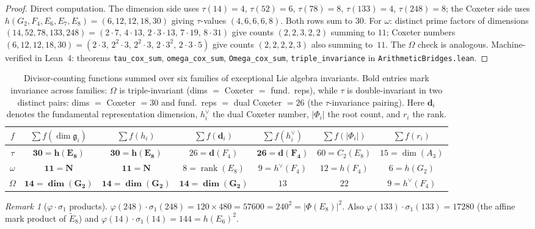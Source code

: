 \documentclass[11pt]{amsart}
\theoremstyle{plain}
\theoremstyle{definition}
\theoremstyle{remark}
\newtheorem{remark}[theorem]{Remark}
\newcommand{\fg}{\mathfrak{g}}
\renewcommand{\Phi}{\varPhi}
\newcommand{\rank}{\operatorname{rank}}
\begin{document}
\begin{proof}
Direct computation. The dimension side uses $\tau(14)=4$, $\tau(52)=6$,
$\tau(78)=8$, $\tau(133)=4$, $\tau(248)=8$; the Coxeter side uses
$h(G_2,F_4,E_6,E_7,E_8)=(6,12,12,18,30)$ giving $\tau$-values
$(4,6,6,6,8)$.  Both rows sum to $30$.  For $\omega$: distinct prime
factors of dimensions $(14,52,78,133,248)=(2{\cdot}7,\,4{\cdot}13,\,2{\cdot}3{\cdot}13,\,
7{\cdot}19,\,8{\cdot}31)$ give counts $(2,2,3,2,2)$ summing to $11$; Coxeter
numbers $(6,12,12,18,30)=(2{\cdot}3,\,2^2{\cdot}3,\,2^2{\cdot}3,\,2{\cdot}3^2,\,
2{\cdot}3{\cdot}5)$ give counts $(2,2,2,2,3)$ also summing to~$11$.  The
$\Omega$ check is analogous.  Machine-verified in Lean~4: theorems
\texttt{tau\_cox\_sum}, \texttt{omega\_cox\_sum}, \texttt{Omega\_cox\_sum},
\texttt{triple\_invariance} in \texttt{ArithmeticBridges.lean}.
\end{proof}

\begin{table}[ht]
\centering
\begin{tabular}{ccccccc}
\toprule
$f$ & $\sum f(\dim\fg_i)$ & $\sum f(h_i)$ & $\sum f(\mathbf{d}_i)$ & $\sum f(h^\vee_i)$ & $\sum f(|\Phi_i|)$ & $\sum f(r_i)$ \\
\midrule
$\tau$ & $\mathbf{30 = h(E_8)}$ & $\mathbf{30 = h(E_8)}$ & $26 = \mathbf{d}(F_4)$ & $\mathbf{26 = \mathbf{d}(F_4)}$ & $60 = C_2(E_8)$ & $15 = \dim(A_3)$ \\
$\omega$ & $\mathbf{11 = N}$ & $\mathbf{11 = N}$ & $8 = \rank(E_8)$ & $9 = h^\vee(F_4)$ & $12 = h(F_4)$ & $6 = h(G_2)$ \\
$\Omega$ & $\mathbf{14 = \dim(G_2)}$ & $\mathbf{14 = \dim(G_2)}$ & $\mathbf{14 = \dim(G_2)}$ & $13$ & $22$ & $9 = h^\vee(F_4)$ \\
\bottomrule
\end{tabular}
\caption{Divisor-counting functions summed over six families of exceptional
  Lie algebra invariants.  Bold entries mark invariance across families:
  $\Omega$ is triple-invariant (dims $=$ Coxeter $=$ fund.\ reps), while
  $\tau$ is double-invariant in two distinct pairs: dims $=$ Coxeter $= 30$
  and fund.\ reps $=$ dual Coxeter $= 26$ (the $\tau$-invariance pairing).
  Here $\mathbf{d}_i$ denotes the fundamental representation dimension,
  $h^\vee_i$ the dual Coxeter number, $|\Phi_i|$ the root count, and $r_i$
  the rank.}\label{tab:sum-over-families}
\end{table}

\begin{remark}[$\varphi \cdot \sigma_1$ products]\label{rem:phi-sigma-product}
$\varphi(248) \cdot \sigma_1(248) = 120 \times 480 = 57600 = 240^2 = |\Phi(E_8)|^2$.
Also $\varphi(133) \cdot \sigma_1(133) = 17280$ (the affine mark product of $\tilde{E}_8$)
and $\varphi(14) \cdot \sigma_1(14) = 144 = h(E_6)^2$.
\end{remark}
\end{document}
